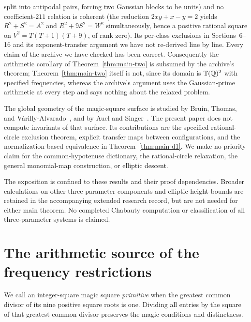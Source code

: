 \documentclass[11pt,letterpaper]{article}
\theoremstyle{definition}\newtheorem{definition}[theorem]{Definition}
\theoremstyle{remark}\newtheorem{remark}[theorem]{Remark}
\newcommand{\Q}{\mathbb Q}\newcommand{\Z}{\mathbb Z}\newcommand{\R}{\mathbb R}
\begin{document}
split into antipodal pairs, forcing two Gaussian blocks to be units) and no coefficient-$211$ relation is coherent (the reduction $2xy+x-y=2$ yields $R^2+S^2=A^2$ and $R^2+9S^2=W^2$ simultaneously, hence a positive rational square on $V^2=T(T+1)(T+9)$, of rank zero). Its per-class exclusions in Sections~6--16 and its exponent-transfer argument we have not re-derived line by line. Every claim of the archive we have checked has been correct. Consequently the arithmetic corollary of Theorem~\ref{thm:main-two} is subsumed by the archive's theorem; Theorem~\ref{thm:main-two} itself is not, since its domain is $\T(\Q)^2$ with specified frequencies, whereas the archive's argument uses the Gaussian-prime arithmetic at every step and says nothing about the relaxed problem.

The global geometry of the magic-square surface is studied by Bruin, Thomas, and V\'arilly-Alvarado~\cite{BTV}, and by Auel and Singer~\cite{AuelSinger}. The present paper does not compute invariants of that surface. Its contributions are the specified rational-circle exclusion theorem, explicit transfer maps between configurations, and the normalization-based equivalence in Theorem~\ref{thm:main-d1}. We make no priority claim for the common-hypotenuse dictionary, the rational-circle relaxation, the general monomial-map construction, or elliptic descent.

The exposition is confined to these results and their proof dependencies. Broader calculations on other three-parameter components and elliptic height bounds are retained in the accompanying extended research record, but are not needed for either main theorem. No completed Chabauty computation or classification of all three-parameter systems is claimed.

\section{The arithmetic source of the frequency restrictions}\label{sec:arithmetic}
We call an integer-square magic square \emph{primitive} when the greatest common divisor of its nine positive square roots is one. Dividing all entries by the square of that greatest common divisor preserves the magic conditions and distinctness.
\end{document}
